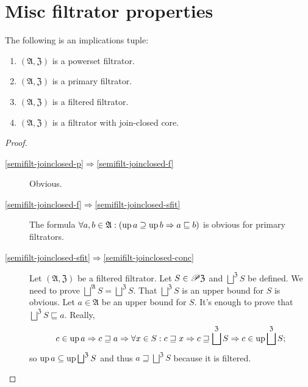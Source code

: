 \section{Misc filtrator properties}
\begin{thm}
\label{semifilt-joinclosed}The following is an implications tuple:
\begin{enumerate}
\item \label{semifilt-joinclosed-p}$(\mathfrak{A},\mathfrak{Z})$ is a
powerset filtrator.
\item \label{semifilt-joinclosed-f}$(\mathfrak{A},\mathfrak{Z})$ is a
primary filtrator.
\item \label{semifilt-joinclosed-sfit}$(\mathfrak{A},\mathfrak{Z})$ is
a filtered filtrator.
\item \label{semifilt-joinclosed-conc}$(\mathfrak{A},\mathfrak{Z})$ is
a filtrator with join-closed core.
\end{enumerate}
\end{thm}
\begin{proof}
~
\begin{description}
\item [{\ref{semifilt-joinclosed-p}$\Rightarrow$\ref{semifilt-joinclosed-f}}] Obvious.
\item [{\ref{semifilt-joinclosed-f}$\Rightarrow$\ref{semifilt-joinclosed-sfit}}] The formula
$\forall a,b\in\mathfrak{A}:(\operatorname{up} a\supseteq\operatorname{up} b\Rightarrow a\sqsubseteq b)$ is obvious for primary filtrators.
\item [{\ref{semifilt-joinclosed-sfit}$\Rightarrow$\ref{semifilt-joinclosed-conc}}] Let
$(\mathfrak{A},\mathfrak{Z})$ be a filtered filtrator. Let $S\in\mathscr{P}\mathfrak{Z}$
and $\bigsqcup^{\mathfrak{Z}}S$ be defined. We need to prove $\bigsqcup^{\mathfrak{A}}S=\bigsqcup^{\mathfrak{Z}}S$.
That $\bigsqcup^{\mathfrak{Z}}S$ is an upper bound for $S$ is obvious.
Let $a\in\mathfrak{A}$ be an upper bound for $S$. It's enough to
prove that $\bigsqcup^{\mathfrak{Z}}S\sqsubseteq a$. Really,
\[
c\in\up a\Rightarrow c\sqsupseteq a\Rightarrow\forall x\in S:c\sqsupseteq x\Rightarrow c\sqsupseteq\bigsqcup^{\mathfrak{Z}}S\Rightarrow c\in\up\bigsqcup^{\mathfrak{Z}}S;
\]
so $\up a\subseteq\up\bigsqcup^{\mathfrak{Z}}S$ and thus $a\sqsupseteq\bigsqcup^{\mathfrak{Z}}S$
because it is filtered.
\end{description}
\end{proof}

